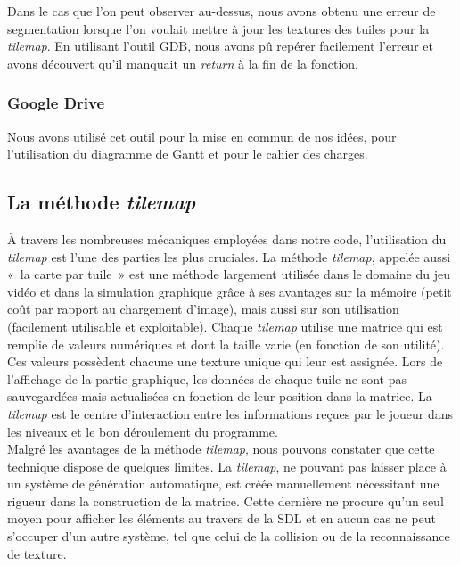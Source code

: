 \documentclass[12pt,a4paper]{article}
\begin{document}
                \tabto{1cm} Dans le cas que l'on peut observer au-dessus, nous avons obtenu une erreur de segmentation lorsque l'on voulait mettre à jour les textures des tuiles pour la \textit{tilemap}. En utilisant l'outil GDB, nous avons pû repérer facilement l'erreur et avons découvert qu'il manquait un \textit{return} à la fin de la fonction.\\
                
            \subsubsection{Google Drive}
                \tabto{1cm} Nous avons utilisé cet outil pour la mise en commun de nos idées, pour l’utilisation du diagramme de Gantt et pour le cahier des charges.

        \subsection{La méthode \textit{tilemap}}
            \tabto{1cm} À travers les nombreuses mécaniques employées dans notre code, l’utilisation du \textit{tilemap} est l’une des parties les plus cruciales. La méthode \textit{tilemap}, appelée aussi «~la carte par tuile~» est une méthode largement utilisée dans le domaine du jeu vidéo et dans la simulation graphique grâce à ses avantages sur la mémoire (petit coût par rapport au chargement d’image), mais aussi sur son utilisation (facilement utilisable et exploitable). Chaque \textit{tilemap} utilise une matrice qui est remplie de valeurs numériques et dont la taille varie (en fonction de son utilité). Ces valeurs possèdent chacune une texture unique qui leur est assignée. Lors de l’affichage de la partie graphique, les données de chaque tuile ne sont pas sauvegardées mais actualisées en fonction de leur position dans la matrice. La \textit{tilemap} est le centre d’interaction entre les informations reçues par le joueur dans les niveaux et le bon déroulement du programme.\\
	
        	\tabto{1cm} Malgré les avantages de la méthode \textit{tilemap}, nous pouvons constater que cette technique dispose de quelques limites. La \textit{tilemap}, ne pouvant pas laisser place à un système de génération automatique, est créée manuellement nécessitant une rigueur dans la construction de la matrice. Cette dernière ne procure qu’un seul moyen pour afficher les éléments au travers de la SDL et en aucun cas ne peut s’occuper d’un autre système, tel que celui de la collision ou de la reconnaissance de texture.
\end{document}
